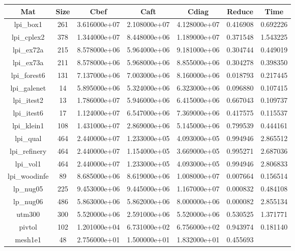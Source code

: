 \begin{table}[h]
\centering
  \begin{tabular}{ccccccc}
    \hline
    Mat & Size & Cbef & Caft & Cdiag & Reduce & Time\\
    \hline
    lpi\_box1 & 261 & 3.616000e+07 & 2.108000e+07 & 4.128000e+07 & 0.416908 &
    0.692226\\
    lpi\_cplex2 & 378 & 1.344000e+07 & 8.448000e+06 & 1.189000e+07 & 0.371548
    & 1.543225\\
    lpi\_ex72a & 215 & 8.578000e+06 & 5.964000e+06 & 9.181000e+06 & 0.304744 &
    0.449019\\
    lpi\_ex73a & 211 & 8.578000e+06 & 5.968000e+06 & 8.855000e+06 & 0.304278 &
    0.398350\\
    lpi\_forest6 & 131 & 7.137000e+06 & 7.003000e+06 & 8.160000e+06 & 0.018793
    & 0.217445\\
    lpi\_galenet & 14 & 5.895000e+06 & 5.324000e+06 & 6.323000e+06 & 0.096880
    & 0.107415\\
    lpi\_itest2 & 13 & 1.786000e+07 & 5.946000e+06 & 6.415000e+06 & 0.667043 &
    0.109737\\
    lpi\_itest6 & 17 & 1.124000e+07 & 6.547000e+06 & 7.369000e+06 & 0.417575 &
    0.115537\\
    lpi\_klein1 & 108 & 1.431000e+07 & 2.869000e+06 & 5.145000e+06 & 0.799539
    & 0.444161\\
    lpi\_qual & 464 & 2.440000e+07 & 1.233000e+05 & 4.093000e+05 & 0.994946 &
    2.865512\\
    lpi\_refinery & 464 & 2.440000e+07 & 1.154000e+05 & 3.669000e+05 &
    0.995271 & 2.687036\\
    lpi\_vol1 & 464 & 2.440000e+07 & 1.233000e+05 & 4.093000e+05 & 0.994946 &
    2.806833\\
    lpi\_woodinfe & 89 & 8.685000e+06 & 8.619000e+06 & 1.008000e+07 & 0.007664
    & 0.156514\\
    lp\_nug05 & 225 & 9.453000e+06 & 9.445000e+06 & 1.167000e+07 & 0.000832 &
    0.484108\\
    lp\_nug06 & 486 & 5.863000e+06 & 5.862000e+06 & 8.000000e+06 & 0.000082 &
    2.855134\\
    utm300 & 300 & 5.520000e+06 & 2.591000e+06 & 5.520000e+06 & 0.530525 &
    1.371771\\
    pivtol & 102 & 1.201000e+04 & 6.731000e+02 & 6.756000e+02 & 0.943974 &
    0.181140\\
    mesh1e1 & 48 & 2.756000e+01 & 1.500000e+01 & 1.832000e+01 & 0.455693 &

\end{tabular}
\end{table}
